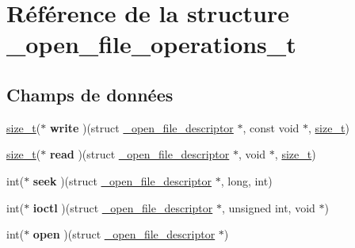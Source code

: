 \hypertarget{struct__open__file__operations__t}{\section{Référence de la structure \-\_\-open\-\_\-file\-\_\-operations\-\_\-t}
\label{struct__open__file__operations__t}
}
\subsection*{Champs de données}
\begin{DoxyCompactItemize}
\item 
\hypertarget{struct__open__file__operations__t_a8fd3ceb02ffc1f1e0c7123c6827f79c2}{\hyperlink{kernel_2include_2types_8h_a29d85914ddff32967d85ada69854206d}{size\-\_\-t}($\ast$ {\bfseries write} )(struct \hyperlink{struct__open__file__descriptor}{\-\_\-open\-\_\-file\-\_\-descriptor} $\ast$, const void $\ast$, \hyperlink{kernel_2include_2types_8h_a29d85914ddff32967d85ada69854206d}{size\-\_\-t})}\label{struct__open__file__operations__t_a8fd3ceb02ffc1f1e0c7123c6827f79c2}

\item 
\hypertarget{struct__open__file__operations__t_abeef0438fc2a1902a33c94bcf9751dac}{\hyperlink{kernel_2include_2types_8h_a29d85914ddff32967d85ada69854206d}{size\-\_\-t}($\ast$ {\bfseries read} )(struct \hyperlink{struct__open__file__descriptor}{\-\_\-open\-\_\-file\-\_\-descriptor} $\ast$, void $\ast$, \hyperlink{kernel_2include_2types_8h_a29d85914ddff32967d85ada69854206d}{size\-\_\-t})}\label{struct__open__file__operations__t_abeef0438fc2a1902a33c94bcf9751dac}

\item 
\hypertarget{struct__open__file__operations__t_ac45e5e3400e4cd9756b5784289744cc7}{int($\ast$ {\bfseries seek} )(struct \hyperlink{struct__open__file__descriptor}{\-\_\-open\-\_\-file\-\_\-descriptor} $\ast$, long, int)}\label{struct__open__file__operations__t_ac45e5e3400e4cd9756b5784289744cc7}

\item 
\hypertarget{struct__open__file__operations__t_ab71efab6158837196ad4fef57565dddc}{int($\ast$ {\bfseries ioctl} )(struct \hyperlink{struct__open__file__descriptor}{\-\_\-open\-\_\-file\-\_\-descriptor} $\ast$, unsigned int, void $\ast$)}\label{struct__open__file__operations__t_ab71efab6158837196ad4fef57565dddc}

\item 
\hypertarget{struct__open__file__operations__t_a22018bcaef028f486c45838ba983c170}{int($\ast$ {\bfseries open} )(struct \hyperlink{struct__open__file__descriptor}{\-\_\-open\-\_\-file\-\_\-descriptor} $\ast$)}\label{struct__open__file__operations__t_a22018bcaef028f486c45838ba983c170}


\end{DoxyCompactItemize}
